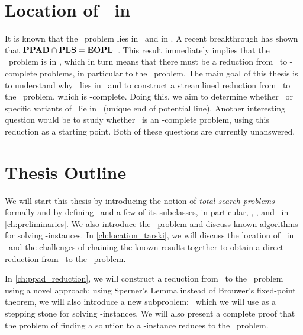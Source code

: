 \section{Location of \Tarski\ in \TFNP}\label{sec:intro_location_tarski}

It is known that the \Tarski\ problem lies in \PPAD\ and in \PLS\@. A recent breakthrough has shown that $\textbf{PPAD} \cap \textbf{PLS} = \textbf{EOPL}$~. This result immediately implies that the \Tarski\ problem is in \EOPL, which in turn means that there must be a reduction from \Tarski\ to \EOPL-complete problems, in particular to the \EndOfPotentialLine\ problem. The main goal of this thesis is to understand why \Tarski\ lies in \EOPL\ and to construct a streamlined reduction from \Tarski\ to the \EndOfPotentialLine\ problem, which is \EOPL-complete. Doing this, we aim to determine whether \Tarski\ or specific variants of \Tarski\ lie in \UEOPL\ (unique end of potential line). Another interesting question would be to study whether \Tarski\ is an \EOPL-complete problem, using this reduction as a starting point. Both of these questions are currently unanswered.

\section{Thesis Outline}\label{sec:intro_outline}

We will start this thesis by introducing the notion of \emph{total search problems} formally and by defining \TFNP\ and a few of its subclasses, in particular, \PPAD, \PLS, and \EOPL\ in \cref{ch:preliminaries}. We also introduce the \Tarski\ problem and discuss known algorithms for solving \Tarski-instances. In \cref{ch:location_tarski}, we will discuss the location of \Tarski\ in \TFNP\ and the challenges of chaining the known results together to obtain a direct reduction from \Tarski\ to the \EndOfPotentialLine\ problem.

In \cref{ch:ppad_reduction}, we will construct a reduction from \Tarski\ to the \EndOfLine\ problem using a novel approach: using Sperner's Lemma instead of Brouwer's fixed-point theorem, we will also introduce a new subproblem: \Tarskistar\ which we will use as a stepping stone for solving \Tarski-instances. We will also present a complete proof that the problem of finding a solution to a \Sperner-instance reduces to the \EndOfLine\ problem.

